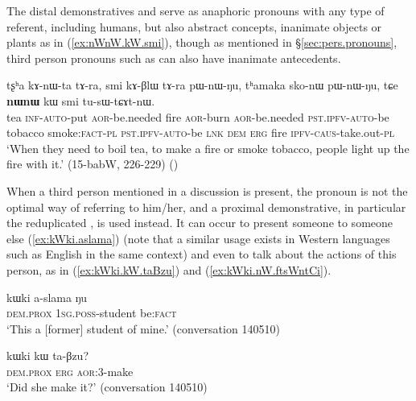 The distal demonstratives  and  serve as anaphoric pronouns with any type of referent, including humans, but also abstract concepts, inanimate objects or plants as in (\ref{ex:nWnW.kW.smi}), though as mentioned in §\ref{sec:pers.pronouns},  third person pronouns such as  can also have inanimate antecedents.

\begin{exe}
\ex \label{ex:nWnW.kW.smi}
 \gll tʂʰa kɤ-nɯ-ta tɤ-ra, smi kɤ-βlɯ tɤ-ra pɯ-nɯ-ŋu, tʰamaka sko-nɯ pɯ-nɯ-ŋu, tɕe \textbf{nɯnɯ} kɯ smi tu-sɯ-tɕɤt-nɯ. \\
 tea \textsc{inf}-\textsc{auto}-put \textsc{aor}-be.needed fire  \textsc{aor}-burn \textsc{aor}-be.needed \textsc{pst}.\textsc{ipfv}-\textsc{auto}-be tobacco smoke:\textsc{fact}-\textsc{pl} \textsc{pst}.\textsc{ipfv}-\textsc{auto}-be \textsc{lnk} \textsc{dem} \textsc{erg} fire \textsc{ipfv}-\textsc{caus}-take.out-\textsc{pl} \\
 \glt `When they need to boil tea, to make a fire or smoke tobacco, people light up the fire with it.' (15-babW, 226-229) ()
\end{exe}

When a third person mentioned in a discussion is present, the pronoun  is not the optimal way of referring to him/her, and a proximal demonstrative, in particular the reduplicated , is used instead. It can occur to present someone to someone else (\ref{ex:kWki.aslama}) (note that a similar usage exists in Western languages such as English in the same context) and even to talk about the actions of this person, as in  (\ref{ex:kWki.kW.taBzu}) and (\ref{ex:kWki.nW.ftsWntCi}).

\begin{exe}
\ex \label{ex:kWki.aslama}
 \gll kɯki a-slama ŋu \\
\textsc{dem}.\textsc{prox} \textsc{1sg}.\textsc{poss}-student be:\textsc{fact} \\
\glt `This a [former] student of mine.' (conversation 140510)
\end{exe}

\begin{exe}
\ex \label{ex:kWki.kW.taBzu}
 \gll  kɯki kɯ ta-βzu? \\
 \textsc{dem}.\textsc{prox} \textsc{erg} \textsc{aor}:3\flobv{}-make \\
 \glt `Did she make it?' (conversation 140510)
\end{exe}

